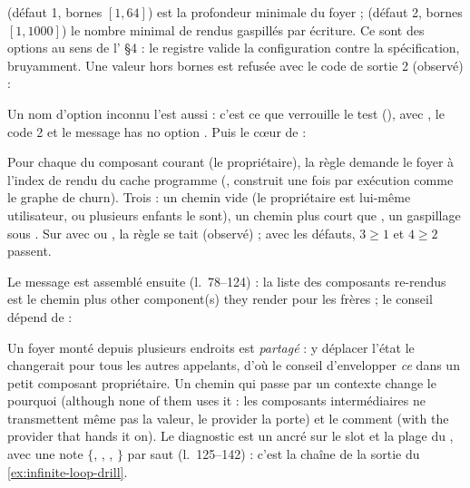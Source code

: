  (défaut 1, bornes $[1,64]$) est la profondeur minimale du foyer ;  (défaut 2, bornes $[1,1000]$) le nombre minimal de rendus gaspillés par écriture. Ce sont des options au sens de l' §4 : le registre valide la configuration contre la spécification, bruyamment. Une valeur hors bornes est refusée avec le code de sortie 2 (observé) :
Un nom d'option inconnu l'est aussi : c'est ce que verrouille le test  (), avec , le code 2 et le message \og has no option \fg.
Puis le cœur de  :


Pour chaque  du composant courant (le propriétaire), la règle demande le foyer à l'index de rendu du cache programme (, construit une fois par exécution comme le graphe de churn). Trois  : un chemin vide (le propriétaire est lui-même utilisateur, ou plusieurs enfants le sont), un chemin plus court que , un gaspillage sous . Sur  avec  ou , la règle se tait (observé) ; avec les défauts, $3 $ et $4 $ passent.

Le message est assemblé ensuite (l.~78--124) : la liste des composants re-rendus est le chemin plus \og {} other component(s) they render\fg{} pour les frères ; le conseil dépend de  :


Un foyer monté depuis plusieurs endroits est \emph{partagé} : y déplacer l'état le changerait pour tous les autres appelants, d'où le conseil d'envelopper \emph{ce}  dans un petit composant propriétaire. Un chemin qui passe par un contexte change le \og pourquoi\fg{} (\og although none of them uses it\fg{} : les composants intermédiaires ne transmettent même pas la valeur, le provider la porte) et le \og comment\fg{} (\og with the  provider that hands it on\fg). Le diagnostic est un \Warning{} ancré sur le slot et la plage du , avec une note $\{$, , , $\}$ par saut (l.~125--142) : c'est la chaîne de la sortie du \cref{ex:infinite-loop-drill}.

